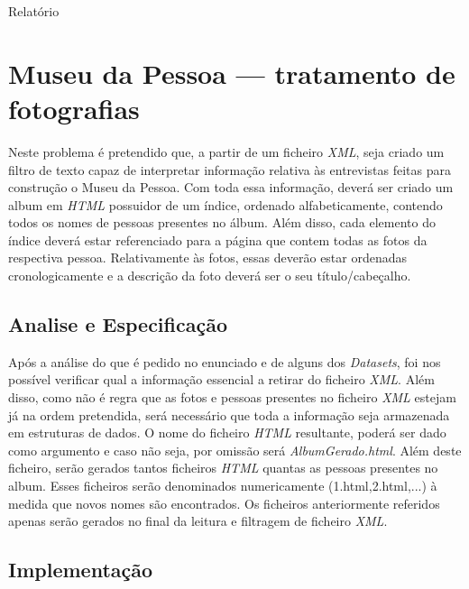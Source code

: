 Relatório


\chapter{Museu da Pessoa — tratamento de fotografias}
\label{cap:museu}
Neste problema é pretendido que, a partir de um ficheiro \emph{XML}, seja criado um filtro de texto capaz de interpretar informação relativa às entrevistas feitas para construção o Museu da Pessoa. Com toda essa informação, deverá ser criado um album em \emph{HTML} possuidor de um índice, ordenado alfabeticamente, contendo todos os nomes de pessoas presentes no álbum. Além disso, cada elemento do índice deverá estar referenciado para a página que contem todas as fotos da respectiva pessoa. Relativamente às fotos, essas deverão estar ordenadas cronologicamente e a descrição da foto deverá ser o seu título/cabeçalho.

\section{Analise e Especificação}
\label{seq:museu-ana}
Após a análise do que é pedido no enunciado e de alguns dos \emph{Datasets}, foi nos possível verificar qual a informação essencial a retirar do ficheiro \emph{XML}. Além disso, como não é regra que as fotos e pessoas presentes no ficheiro \emph{XML} estejam já na ordem pretendida, será necessário que toda a informação seja armazenada em estruturas de dados. O nome do ficheiro \emph{HTML} resultante, poderá ser dado como argumento e caso não seja, por omissão será \emph{AlbumGerado.html}. Além deste ficheiro, serão gerados tantos ficheiros \emph{HTML} quantas as pessoas presentes no album. Esses ficheiros serão denominados numericamente (1.html,2.html,...) à medida que novos nomes são encontrados. Os ficheiros anteriormente referidos apenas serão gerados no final da leitura e filtragem de ficheiro \emph{XML}.


\section{Implementação}
\label{seq:museu-imp}
